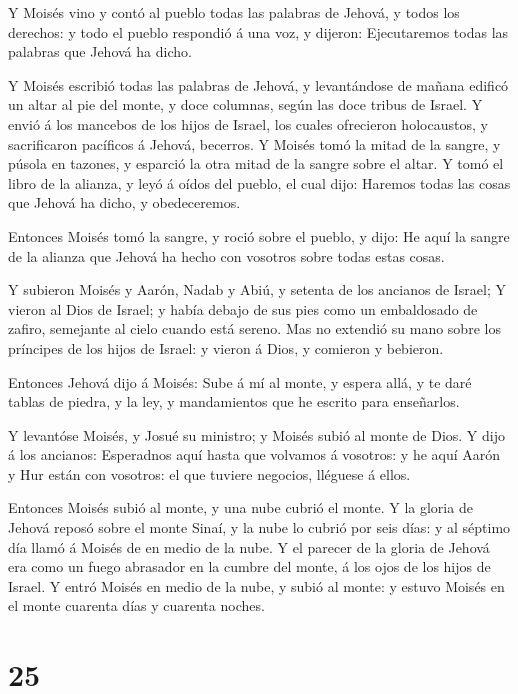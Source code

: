  Y Moisés vino y contó al pueblo todas las palabras de
Jehová, y todos los derechos: y todo el pueblo respondió á una voz, y
dijeron: Ejecutaremos todas las palabras que Jehová ha dicho.

 Y Moisés escribió todas las palabras de Jehová, y
levantándose de mañana edificó un altar al pie del monte, y doce
columnas, según las doce tribus de Israel.  Y envió á los
mancebos de los hijos de Israel, los cuales ofrecieron holocaustos, y
sacrificaron pacíficos á Jehová, becerros.  Y Moisés tomó la
mitad de la sangre, y púsola en tazones, y esparció la otra mitad de la
sangre sobre el altar.  Y tomó el libro de la alianza, y
leyó á oídos del pueblo, el cual dijo: Haremos todas las cosas que
Jehová ha dicho, y obedeceremos.

 Entonces Moisés tomó la sangre, y roció sobre el pueblo, y
dijo: He aquí la sangre de la alianza que Jehová ha hecho con vosotros
sobre todas estas cosas.

 Y subieron Moisés y Aarón, Nadab y Abiú, y setenta de los
ancianos de Israel;  Y vieron al Dios de Israel; y había
debajo de sus pies como un embaldosado de zafiro, semejante al cielo
cuando está sereno.  Mas no extendió su mano sobre los
príncipes de los hijos de Israel: y vieron á Dios, y comieron y
bebieron.

 Entonces Jehová dijo á Moisés: Sube á mí al monte, y
espera allá, y te daré tablas de piedra, y la ley, y mandamientos que he
escrito para enseñarlos.

 Y levantóse Moisés, y Josué su ministro; y Moisés subió al
monte de Dios.  Y dijo á los ancianos: Esperadnos aquí
hasta que volvamos á vosotros: y he aquí Aarón y Hur están con vosotros:
el que tuviere negocios, lléguese á ellos.

 Entonces Moisés subió al monte, y una nube cubrió el
monte.  Y la gloria de Jehová reposó sobre el monte Sinaí,
y la nube lo cubrió por seis días: y al séptimo día llamó á Moisés de en
medio de la nube.  Y el parecer de la gloria de Jehová era
como un fuego abrasador en la cumbre del monte, á los ojos de los hijos
de Israel.  Y entró Moisés en medio de la nube, y subió al
monte: y estuvo Moisés en el monte cuarenta días y cuarenta noches.

\hypertarget{section-24}{%
\section{25}\label{section-24}}

